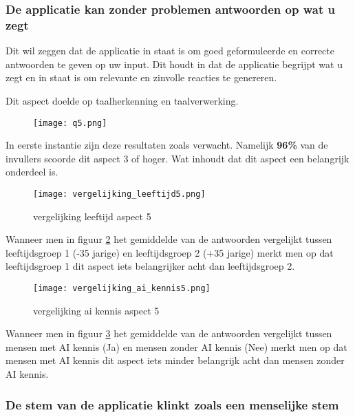 \newpage

\subsubsection{De applicatie kan zonder problemen antwoorden op wat u zegt}

Dit wil zeggen  dat de applicatie in staat is om goed geformuleerde en correcte antwoorden te geven op uw input. Dit houdt in dat de applicatie begrijpt wat u zegt en in staat is om relevante en zinvolle reacties te genereren. 

Dit aspect doelde op taalherkenning en taalverwerking.

\begin{figure}[htbp]
    \centering
    \texttt{[image: q5.png]}
    \label{fig:vraag_5_resultaat}
\end{figure}

In eerste instantie zijn deze resultaten zoals verwacht. Namelijk \textbf{96\%} van de invullers scoorde dit aspect 3 of hoger. Wat inhoudt dat dit aspect een belangrijk onderdeel is.

\begin{figure}[htbp]
    \centering
    \texttt{[image: vergelijking\_leeftijd5.png]}
    \caption{vergelijking leeftijd aspect 5}
    \label{fig:vergelijking_leeftijd5}
\end{figure}

Wanneer men in figuur \ref{fig:vergelijking_leeftijd5} het gemiddelde van de antwoorden vergelijkt tussen leeftijdsgroep 1 (-35 jarige) en leeftijdsgroep 2 (+35 jarige) merkt men op dat leeftijdsgroep 1 dit aspect iets belangrijker acht dan leeftijdsgroep 2.

\newpage

\begin{figure}[htbp]
    \centering
    \texttt{[image: vergelijking\_ai\_kennis5.png]}
    \caption{vergelijking ai kennis aspect 5}
    \label{fig:vergelijking_ai_kennis5}
\end{figure}

Wanneer men in figuur \ref{fig:vergelijking_ai_kennis5} het gemiddelde van de antwoorden vergelijkt tussen mensen met AI kennis (Ja) en mensen zonder AI kennis (Nee) merkt men op dat mensen met AI kennis dit aspect iets minder belangrijk acht dan mensen zonder AI kennis.

\newpage

\subsubsection{De stem van de applicatie klinkt zoals een menselijke stem}

